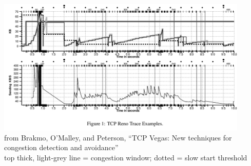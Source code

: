 \begin{frame}[label=vegasrenotrace]{}
\includegraphics[width=0.9\textwidth]{../congest/vegas-fig1} \\
{
    \tiny from Brakmo, O'Malley, and Peterson, ``TCP Vegas: New techniques for
congestion detection and avoidance''} \\
    \small top thick, light-grey line = congestion window; dotted = slow start threshold
\end{frame}


